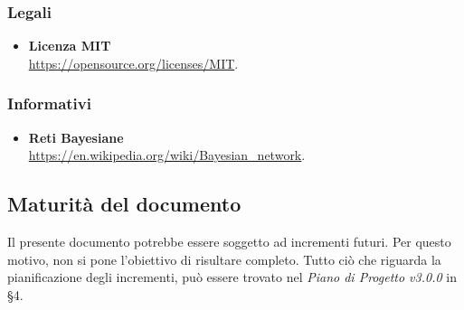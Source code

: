 \subsubsection{Legali}
\begin{itemize}
	\item{\textbf{Licenza MIT}\\
		\url{https://opensource.org/licenses/MIT}}.
\end{itemize}
\subsubsection{Informativi}
\begin{itemize}
	\item{\textbf{Reti Bayesiane}\\
			\url{https://en.wikipedia.org/wiki/Bayesian_network}}.
\end{itemize}

\subsection{Maturità del documento}
Il presente documento potrebbe essere soggetto ad incrementi futuri. Per questo motivo, non si pone l'obiettivo di risultare completo.
Tutto ciò che riguarda la pianificazione degli incrementi, può essere trovato nel \emph{Piano di Progetto v3.0.0} in §4.
\pagebreak